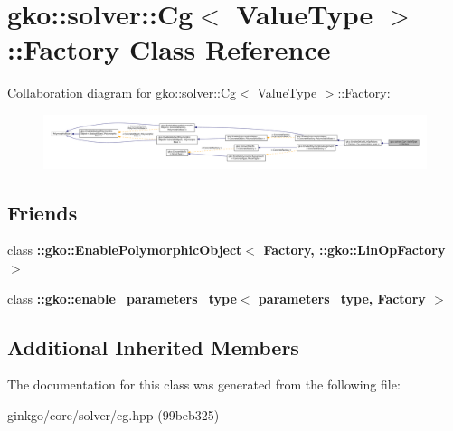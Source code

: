 \hypertarget{classgko_1_1solver_1_1Cg_1_1Factory}{}\section{gko\+:\+:solver\+:\+:Cg$<$ Value\+Type $>$\+:\+:Factory Class Reference}
\label{classgko_1_1solver_1_1Cg_1_1Factory}


Collaboration diagram for gko\+:\+:solver\+:\+:Cg$<$ Value\+Type $>$\+:\+:Factory\+:
\nopagebreak
\begin{figure}[H]
\begin{center}
\leavevmode
\includegraphics[width=350pt]{classgko_1_1solver_1_1Cg_1_1Factory__coll__graph}
\end{center}
\end{figure}
\subsection*{Friends}
\begin{DoxyCompactItemize}
\item 
\mbox{\label{classgko_1_1solver_1_1Cg_1_1Factory_a27e9bbc94a1c1c59f40833153eda8f78}} 
class {\bfseries \+::gko\+::\+Enable\+Polymorphic\+Object$<$ Factory, \+::gko\+::\+Lin\+Op\+Factory $>$}
\item 
\mbox{\label{classgko_1_1solver_1_1Cg_1_1Factory_a0d176cbd42d6214e11aee8c30ca256fc}} 
class {\bfseries \+::gko\+::enable\+\_\+parameters\+\_\+type$<$ parameters\+\_\+type, Factory $>$}
\end{DoxyCompactItemize}
\subsection*{Additional Inherited Members}


The documentation for this class was generated from the following file\+:\begin{DoxyCompactItemize}
\item 
ginkgo/core/solver/cg.\+hpp (99beb325)\end{DoxyCompactItemize}
